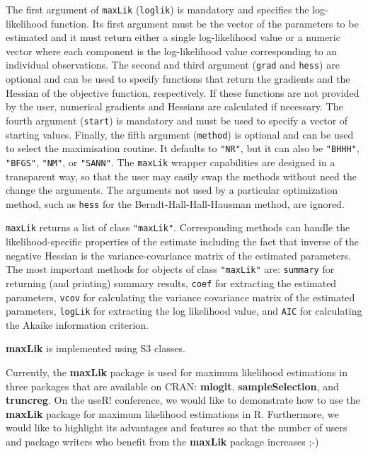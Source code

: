 \documentclass[10pt]{article}
\newcommand{\code}[1]{\texttt{#1}}
\begin{document}
The first argument of \code{maxLik} (\code{loglik})
is mandatory and specifies the log-likelihood function.
Its first argument must be the vector of the parameters to be estimated
and it must return either a single log-likelihood value or
a numeric vector where each component is the log-likelihood value
corresponding to an individual observations.
The second and third argument (\code{grad} and \code{hess})
are optional and can be used to specify functions
that return the gradients and the Hessian of the objective function,
respectively.
If these functions are not provided by the user,
numerical gradients and Hessians are calculated if necessary.
The fourth argument (\code{start}) is mandatory and
must be used to specify a vector of starting values.
Finally, the fifth argument (\code{method}) is optional and
can be used to select the maximisation routine.
It defaults to \code{"NR"}, but it can also be \code{"BHHH"},
\code{"BFGS"}, \code{"NM"}, or \code{"SANN"}.  The \code{maxLik}
wrapper capabilities are designed in a transparent way, so that the
user may easily swap the methods without need the change the
arguments.  The arguments not used by a particular optimization
method, such as \code{hess} for the Berndt-Hall-Hall-Hausman method,
are ignored.

\code{maxLik} returns a list of class \code{"maxLik"}.
Corresponding methods can handle the likelihood-specific properties
of the estimate including the fact
that inverse of the negative Hessian is the variance-covariance matrix
of the estimated parameters.
The most important methods for objects of class \code{"maxLik"} are:
\code{summary} for returning (and printing) summary results,
\code{coef} for extracting the estimated parameters,
\code{vcov} for calculating the variance covariance matrix
of the estimated parameters,
\code{logLik} for extracting the log likelihood value, and
\code{AIC} for calculating the Akaike information criterion.

\textbf{maxLik} is implemented using S3 classes.

Currently, the \textbf{maxLik} package is used for maximum likelihood
estimations in three packages that are available on CRAN:
\textbf{mlogit}, \textbf{sampleSelection},
and \textbf{truncreg}.
On the useR! conference,
we would like to demonstrate how to use the \textbf{maxLik} package
for maximum likelihood estimations in \textsf{R}.
Furthermore, we would like to highlight its advantages and features
so that the number of users and package writers
who benefit from the \textbf{maxLik} package increases ;-)

%
%
\end{document}
